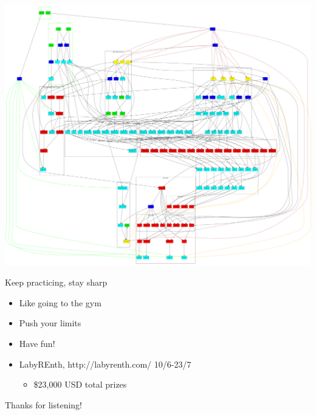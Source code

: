 \documentclass[10pt, compress]{beamer}
\begin{document}
\begin{frame}[standout]
\includegraphics[width=1\textwidth]{images/netlist4_abstract.png}
\end{frame}


\begin{frame}{Keep practicing, stay sharp}
	\begin{itemize}
		\item Like going to the gym
		\item Push your limits
		\item Have fun!
		\item LabyREnth, http://labyrenth.com/ 10/6-23/7
			\begin{itemize}
			\item \$23,000 USD total prizes
			\end{itemize}
	\end{itemize}
\end{frame}

\begin{frame}[standout]
Thanks for listening!
\end{frame}
\end{document}
